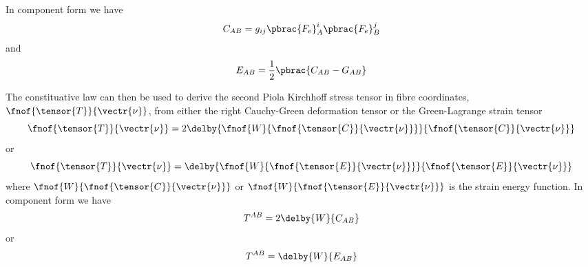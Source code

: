 In component form we have
\begin{equation}
  C_{AB}=g_{ij}\pbrac{F_{e}}^{i}_{A}\pbrac{F_{e}}^{j}_{B}
\end{equation}
and
\begin{equation}
  E_{AB}=\frac{1}{2}\pbrac{C_{AB}-G_{AB}}
\end{equation}

The constituative law can then be used to derive the second Piola Kirchhoff
stress tensor in fibre coordinates, $\fnof{\tensor{T}}{\vectr{\nu}}$, from
either the right Cauchy-Green deformation tensor or the Green-Lagrange strain
tensor \ie
\begin{equation}
  \fnof{\tensor{T}}{\vectr{\nu}}=2\delby{\fnof{W}{\fnof{\tensor{C}}{\vectr{\nu}}}}{\fnof{\tensor{C}}{\vectr{\nu}}}
\end{equation}
or
\begin{equation}
  \fnof{\tensor{T}}{\vectr{\nu}}=\delby{\fnof{W}{\fnof{\tensor{E}}{\vectr{\nu}}}}{\fnof{\tensor{E}}{\vectr{\nu}}}
\end{equation}
where $\fnof{W}{\fnof{\tensor{C}}{\vectr{\nu}}}$ or
$\fnof{W}{\fnof{\tensor{E}}{\vectr{\nu}}}$ is the strain energy
function. In component form we have
\begin{equation}
  T^{AB}=2\delby{W}{C_{AB}}
\end{equation}
or
\begin{equation}
  T^{AB}=\delby{W}{E_{AB}}
\end{equation}

